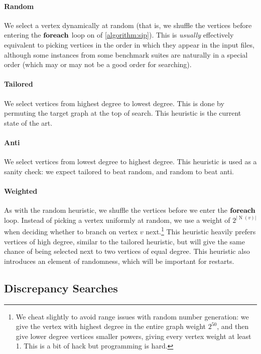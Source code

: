 \documentclass{article}
\newcommand{\neighbourhood}{\operatorname{N}}
\begin{document}
\paragraph{Random} We select a vertex dynamically at random (that is, we shuffle the vertices before
entering the $\KwSty{foreach}$ loop on  of \cref{algorithm:sip}). This is
\emph{usually} effectively equivalent to picking vertices in the order in which they appear in the
input files, although some instances from some benchmark suites are naturally in a special order
(which may or may not be a good order for searching).

\paragraph{Tailored} We select vertices from highest degree to lowest degree. This is done by
permuting the target graph at the top of search. This heuristic is the current state of the art.

\paragraph{Anti} We select vertices from lowest degree to highest degree. This heuristic is used as
a sanity check: we expect tailored to beat random, and random to beat anti.

\paragraph{Weighted} As with the random heuristic, we shuffle the vertices before we enter the
$\KwSty{foreach}$ loop. Instead of picking a vertex uniformly at random, we use a weight of
$2^{\left|\neighbourhood(v)\right|}$ when deciding whether to branch on vertex $v$ next.\footnote{We
cheat slightly to avoid range issues with random number generation: we give the vertex with highest
degree in the entire graph weight $2^{50}$, and then give lower degree vertices smaller powers,
giving every vertex weight at least 1.  This is a bit of hack but programming is hard.} This
heuristic heavily prefers vertices of high degree, similar to the tailored heuristic, but will give
the same chance of being selected next to two vertices of equal degree. This heuristic also
introduces an element of randomness, which will be important for restarts.

\subsection{Discrepancy Searches}
\end{document}
